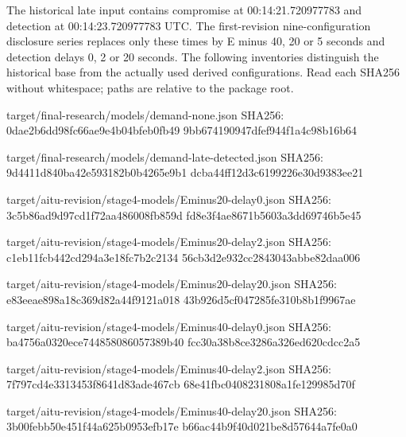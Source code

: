 \documentclass[12pt,a4paper]{article}
\begin{document}
The historical late input contains compromise at 00:14:21.720977783 and detection at 00:14:23.720977783 UTC. The first-revision nine-configuration disclosure series replaces only these times by E minus 40, 20 or 5 seconds and detection delays 0, 2 or 20 seconds. The following inventories distinguish the historical base from the actually used derived configurations. Read each SHA256 without whitespace; paths are relative to the package root.

target/final-research/models/demand-none.json\newline{}
SHA256: 0dae2b6dd98fc66ae9e4b04bfeb0fb49\newline{}
9bb674190947dfef944f1a4c98b16b64

target/final-research/models/demand-late-detected.json\newline{}
SHA256: 9d4411d840ba42e593182b0b4265e9b1\newline{}
dcba44ff12d3c6199226e30d9383ee21

target/aitu-revision/stage4-models/Eminus20-delay0.json\newline{}
SHA256: 3c5b86ad9d97cd1f72aa486008fb859d\newline{}
fd8e3f4ae8671b5603a3dd69746b5e45

target/aitu-revision/stage4-models/Eminus20-delay2.json\newline{}
SHA256: c1eb11fcb442cd294a3e18fc7b2c2134\newline{}
56cb3d2e932cc2843043abbe82daa006

target/aitu-revision/stage4-models/Eminus20-delay20.json\newline{}
SHA256: e83eeae898a18c369d82a44f9121a018\newline{}
43b926d5cf047285fe310b8b1f9967ae

target/aitu-revision/stage4-models/Eminus40-delay0.json\newline{}
SHA256: ba4756a0320ece744858086057389b40\newline{}
fcc30a38b8ce3286a326ed620cdcc2a5

target/aitu-revision/stage4-models/Eminus40-delay2.json\newline{}
SHA256: 7f797cd4e3313453f8641d83ade467cb\newline{}
68e41fbc0408231808a1fe129985d70f

target/aitu-revision/stage4-models/Eminus40-delay20.json\newline{}
SHA256: 3b00febb50e451f44a625b0953efb17e\newline{}
b66ac44b9f40d021be8d57644a7fe0a0
\end{document}
